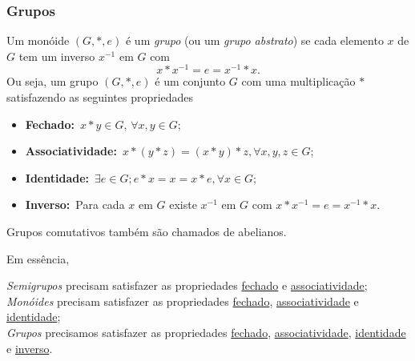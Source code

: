 \subsubsection{Grupos}
\begin{definition}
  Um monóide $(G,* , e)$ é um \emph{grupo} (ou um \emph{grupo abstrato}) se cada elemento $x$ de $G$ tem um inverso $x^{-1}$ em $G$ com $$x* x^{-1} = e = x^{-1} * x.$$
  Ou seja, um grupo $(G,* , e)$ é um conjunto $G$ com uma multiplicação $*$ satisfazendo as seguintes propriedades
  \begin{itemize}
    \item \textbf{Fechado:}\ $x* y \in G$, $\forall x,y \in G$;
    \item \textbf{Associatividade:}\ $x * (y* z) = (x* y) * z, \forall x,y,z \in G$;
    \item \textbf{Identidade:}\ $\exists e \in G; e* x = x = x* e, \forall x \in G$;
    \item \textbf{Inverso:}\ Para cada $x$ em $G$ existe $x^{-1}$ em $G$ com $x* x^{-1} = e = x^{-1} * x$.
  \end{itemize}
  Grupos comutativos também são chamados de abelianos.
\end{definition}
Em essência, 

\emph{Semigrupos} precisam satisfazer as propriedades \underline{fechado} e \underline{associatividade};\\ 
\emph{Monóides} precisam satisfazer as propriedades \underline{fechado}, \underline{associatividade} e \underline{identidade};\\
\emph{Grupos} precisamos satisfazer as propriedades \underline{fechado}, \underline{associatividade}, \underline{identidade} e \underline{inverso}.


